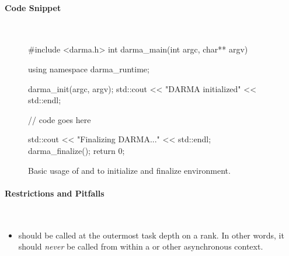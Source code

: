 \paragraph{Code Snippet}\mbox{} \\
\begin{figure}[!h]
\begin{CppCodeNumb}
#include <darma.h>
int darma_main(int argc, char** argv)
{
  using namespace darma_runtime;

  darma_init(argc, argv);
  std::cout << "DARMA initialized" << std::endl;

  // code goes here

  std::cout << "Finalizing DARMA..." << std::endl;
  darma_finalize();
  return 0;
}
\end{CppCodeNumb}
\caption{Basic usage of \protect{} and \protect{} 
to initialize and finalize environment.}
\label{fig:fe_api_init}
\end{figure}

\paragraph{Restrictions and Pitfalls}\mbox{} \\
\begin{itemize}
  \item {} should be called at the outermost \gls{task} depth on
    a \gls{rank}.  In other words, it should {\it never} be called from within a
     or other asynchronous context.
\end{itemize}




